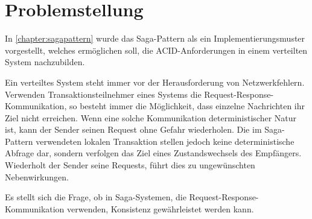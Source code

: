 \section{Problemstellung}

In \cref{chapter:sagapattern} wurde das Saga-Pattern als ein Implementierungsmuster vorgestellt, welches ermöglichen soll, die ACID-Anforderungen in einem verteilten System nachzubilden. 

Ein verteiltes System steht immer vor der Herausforderung von Netzwerkfehlern. Verwenden Transaktionsteilnehmer eines Systems die Request-Response-Kommunikation, so besteht immer die Möglichkeit, dass einzelne Nachrichten ihr Ziel nicht erreichen. Wenn eine solche Kommunikation deterministischer Natur ist, kann der Sender seinen Request ohne Gefahr wiederholen. Die im Saga-Pattern verwendeten lokalen Transaktion stellen jedoch keine deterministische Abfrage dar, sondern verfolgen das Ziel eines Zustandswechsels des Empfängers. Wiederholt der Sender seine Requests, führt dies zu ungewünschten Nebenwirkungen.

Es stellt sich die Frage, ob in Saga-Systemen, die Request-Response-Kommunikation verwenden, Konsistenz gewährleistet werden kann. 